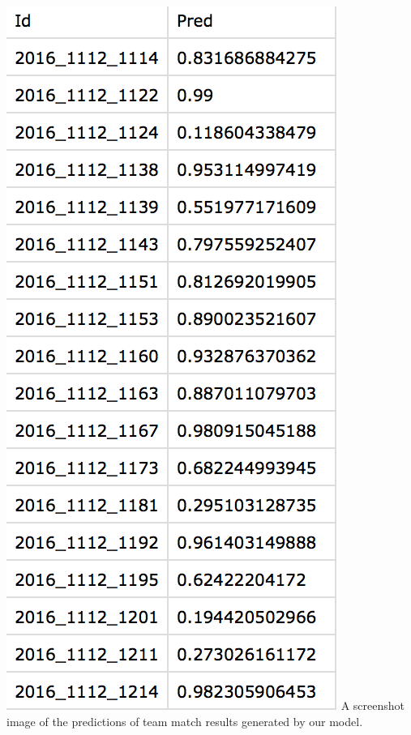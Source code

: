 \documentclass[letterpaper, 10pt,titlepage]{article}
\begin{document}
\includegraphics[width=\textwidth]{prediction.jpg}
A screenshot image of the predictions of team match results generated by our model. 
\end{document}
